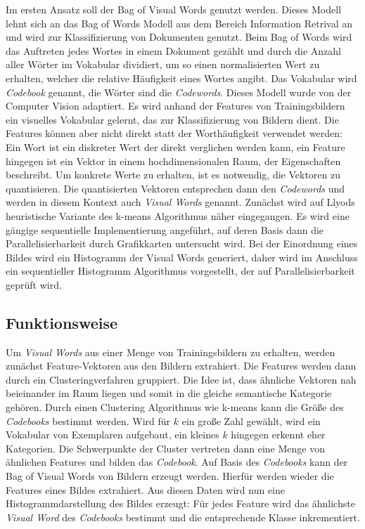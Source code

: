 Im ersten Ansatz soll der Bag of Visual Words genutzt werden. Dieses Modell lehnt sich an das Bag of Words Modell aus dem Bereich Information Retrival an und wird zur Klassifizierung von Dokumenten genutzt. Beim Bag of Words wird das Auftreten jedes Wortes in einem Dokument gezählt und durch die Anzahl aller Wörter im Vokabular dividiert, um so einen normalisierten Wert zu erhalten, welcher die relative Häufigkeit eines Wortes angibt. Das Vokabular wird \textit{Codebook} genannt, die Wörter sind die \textit{Codewords}. \linebreak
Dieses Modell wurde von der Computer Vision adaptiert. Es wird anhand der Features von Trainingsbildern ein visuelles Vokabular gelernt, das zur Klassifizierung von Bildern dient. Die Features können aber nicht direkt statt der Worthäufigkeit verwendet werden: Ein Wort ist ein diskreter Wert der direkt verglichen werden kann, ein Feature hingegen ist ein Vektor in einem hochdimensionalen Raum, der Eigenschaften beschreibt. Um konkrete Werte zu erhalten, ist es notwendig, die Vektoren zu quantisieren. Die quantisierten Vektoren entsprechen dann den \textit{Codewords} und werden in diesem Kontext auch \textit{Visual Words} genannt. Zunächst wird auf Llyods heuristische Variante des k-means Algorithmus näher eingegangen. Es wird eine gängige sequentielle Implementierung angeführt, auf deren Basis dann die Parallelisierbarkeit durch Grafikkarten untersucht wird. 
Bei der Einordnung eines Bildes wird ein Histogramm der Visual Words generiert, daher wird im Anschluss ein sequentieller Histogramm Algorithmus vorgestellt, der auf Parallelisierbarkeit geprüft wird.

\subsection{Funktionsweise}
Um \textit{Visual Words} aus einer Menge von Trainingsbildern zu erhalten, werden zunächst Feature-Vektoren aus den Bildern extrahiert. Die Features werden dann durch ein Clusteringverfahren gruppiert. Die Idee ist, dass ähnliche Vektoren nah beieinander im Raum liegen und somit in die gleiche semantische Kategorie gehören. Durch einen Clustering Algorithmus wie k-means kann die Größe des \textit{Codebooks} bestimmt werden. Wird für $k$ ein große Zahl gewählt, wird ein Vokabular von Exemplaren aufgebaut, ein kleines $k$ hingegen erkennt eher Kategorien. Die Schwerpunkte der Cluster vertreten dann eine Menge von ähnlichen Features und bilden das \textit{Codebook}.
Auf Basis des \textit{Codebooks} kann der Bag of Visual Words von Bildern erzeugt werden. Hierfür werden wieder die Features eines Bildes extrahiert. Aus diesen Daten wird nun eine Histogrammdarstellung des Bildes erzeugt: Für jedes Feature wird das ähnlichste \textit{Visual Word} des \textit{Codebooks} bestimmt und die entsprechende Klasse inkrementiert.

